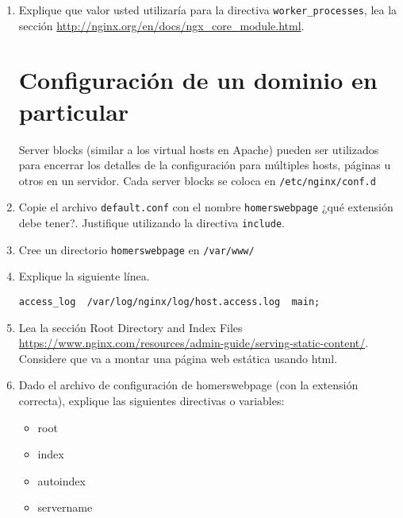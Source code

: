 \documentclass[11pt]{exam}
\begin{document}
\begin{enumerate}
\begin{itemize}
	\end{itemize}

	\item Explique que valor usted utilizaría para la directiva \texttt{worker\_processes}, lea la  sección \url{http://nginx.org/en/docs/ngx_core_module.html}.
		\vspace{1in}
		\newpage
\section{Configuración de un dominio en particular}
Server blocks (similar a los virtual hosts en Apache) pueden ser utilizados para encerrar los detalles de la configuración para múltiples hosts, páginas u otros en un servidor. Cada server blocks se coloca en \texttt{/etc/nginx/conf.d}

	\item Copie el archivo \texttt{default.conf} con el nombre \texttt{homerswebpage} ¿qué extensión debe tener?. Justifique utilizando la directiva \texttt{include}. 
		\vspace{1in}

	\item Cree un directorio \texttt{homerswebpage} en \texttt{/var/www/}
	\item Explique la siguiente línea.\begin{lstlisting}
access_log  /var/log/nginx/log/host.access.log  main;		
	\end{lstlisting}
			\vspace{1in}

	\item Lea la sección Root Directory and Index Files \url{https://www.nginx.com/resources/admin-guide/serving-static-content/}. Considere que va a montar una página web estática usando html.
	\item Dado el archivo de configuración de homerswebpage (con la extensión correcta), explique las siguientes directivas o variables: 
	\begin{itemize}
		\item root
		\vspace{0.5in}
		\item index
				\vspace{0.5in}

		\item autoindex
				\vspace{0.5in}

		\item servername
				\vspace{0.5in}


\end{itemize}
\end{enumerate}
\end{document}
